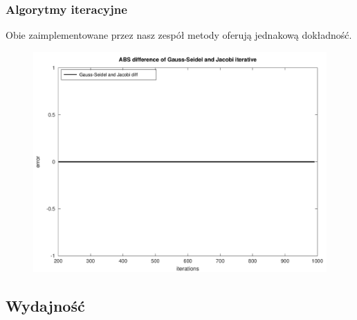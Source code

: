 \documentclass[10pt]{article}
\begin{document}
\subsubsection{Algorytmy iteracyjne}
Obie zaimplementowane przez nasz zespół metody oferują jednakową dokładność.
\begin{figure}[h]
\centering
\includegraphics[scale=0.45]{plots/03_abs_iterative_methods_all_rows.png}
\end{figure}
\subsection {Wydajność}
\end{document}
